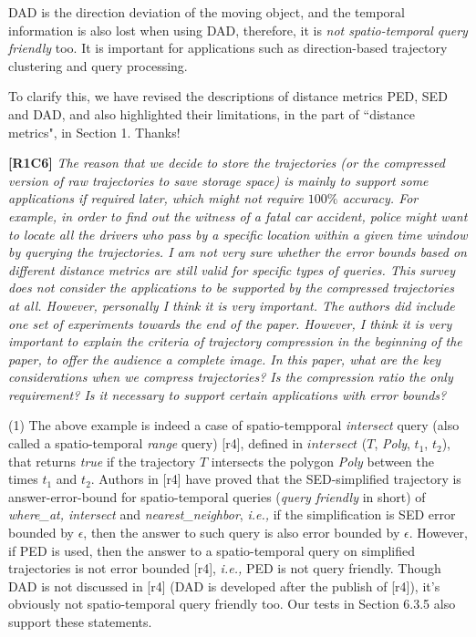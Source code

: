 \documentclass{letter}
\newcommand{\ie}{\emph{i.e.,}\xspace}
\begin{document}
{DAD is the direction deviation of the moving object, and 
the temporal information is also lost when using DAD, therefore, it is \emph{not spatio-temporal query friendly} too. It is important for applications such as direction-based trajectory clustering and query processing.

To clarify this, we have revised the descriptions of distance metrics PED, SED and DAD, and also highlighted their limitations, in the part of ``distance metrics", in Section 1. Thanks!

\textbf{[R1C6]} \emph{ The reason that we decide to store the trajectories (or the compressed version of raw trajectories to save storage space) is mainly to support some applications if required later, which might not require $100\%$ accuracy. For example, in order to find out the witness of a fatal car accident, police might want to locate all the drivers who pass by a specific location within a given time window by querying the trajectories. I am not very sure whether the error bounds based on different distance metrics are still valid for specific types of queries. {This survey does not consider the applications to be supported by the compressed trajectories at all. However, personally I think it is very important.} The authors did include one set of experiments towards the end of the paper. However, I think it is very important to explain the criteria of trajectory compression in the beginning of the paper, to offer the audience a complete image. In this paper, what are the key considerations when we compress trajectories? Is the compression ratio the only requirement? Is it necessary to support certain applications with error bounds? }

(1) The above example is indeed a case of spatio-tempporal \emph{intersect} query (also called a spatio-temporal \emph{range} query) [r4], defined in $intersect$ ($T$, \emph{Poly}, $t_1$, $t_2$), that returns \emph{true} if the trajectory $T$ intersects the polygon \emph{Poly} between the times $t_1$ and $t_2$. Authors in [r4] have proved that the SED-simplified trajectory is answer-error-bound for spatio-temporal queries (\emph{query friendly} in short) of \emph{where\_at, intersect} and \emph{nearest\_neighbor}, \ie if the simplification is SED error bounded by $\epsilon$, then the answer to such query is also error bounded by $\epsilon$.
However, if PED is used, then the answer to a spatio-temporal query on simplified trajectories is not error bounded [r4], \ie PED is not query friendly. Though DAD is not discussed in [r4] (DAD is developed after the publish of [r4]), it's obviously not spatio-temporal query friendly too. Our tests in Section 6.3.5 also support these statements.

}
\end{document}
